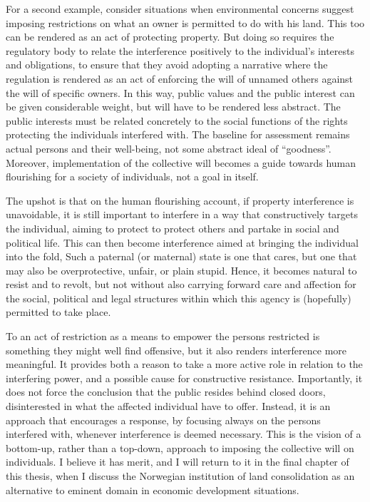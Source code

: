 For a second example, consider situations when environmental concerns suggest imposing restrictions on what an owner is permitted to do with his land. This too can be rendered as an act of protecting property. But doing so requires the regulatory body to relate the interference positively to the individual's interests and obligations, to ensure that they avoid adopting a narrative where the regulation is rendered as an act of enforcing the will of unnamed others against the will of specific owners. In this way, public values and the public interest can be given considerable weight, but will have to be rendered less abstract. The public interests must be related concretely to the social functions of the rights protecting the individuals interfered with. The baseline for assessment remains actual persons and their well-being, not some abstract ideal of ``goodness''. Moreover, implementation of the collective will becomes a guide towards human flourishing for a society of individuals, not a goal in itself.

The upshot is that on the human flourishing account, if property interference is unavoidable, it is still important to interfere in a way that constructively targets the individual, aiming to protect  to protect others and partake in social and political life. This can then become interference aimed at bringing the individual into the fold,  Such a paternal (or maternal) state is one that cares, but one that may also be overprotective, unfair, or plain stupid. Hence, it becomes natural to resist and to revolt, but not without also carrying forward care and affection for the social, political and legal structures within which this agency is (hopefully) permitted to take place.

To  an act of restriction as a means to empower the persons restricted is something they might well find offensive, but it also renders interference more meaningful. It provides both a reason to take a more active role in relation to the interfering power, and a possible cause for constructive resistance. Importantly, it does not force the conclusion that the public resides behind closed doors, disinterested in what the affected individual have to offer. Instead, it is an approach that encourages a response, by focusing always on the persons interfered with, whenever interference is deemed necessary. This is the vision of a bottom-up, rather than a top-down, approach to imposing the collective will on individuals. I believe it has merit, and I will return to it in the final chapter of this thesis, when I discuss the Norwegian institution of land consolidation as an alternative to eminent domain in economic development situations.

